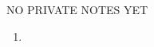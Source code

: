 \documentclass[handout]{mcs}
\begin{document}

\begin{staffnotes}
NO PRIVATE NOTES YET
\end{staffnotes}




\begin{enumerate}
\item {}
\end{enumerate}

\end{document}
